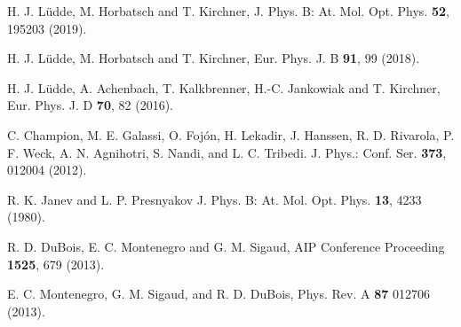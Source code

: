\documentclass[10pt,showpacs,showkeys,twocolumn]{revtex4-1}
\begin{document}
\begin{thebibliography}{}
H. J. L\"udde,  M. Horbatsch and T. Kirchner, 
J. Phys. B: At. Mol. Opt. Phys. \textbf{52}, 195203 (2019).

H. J. L\"udde, M. Horbatsch and T. Kirchner, 
Eur. Phys. J. B \textbf{91}, 99 (2018).

H. J. L\"udde, A. Achenbach, T. Kalkbrenner, H.-C. Jankowiak and T. Kirchner,
Eur. Phys. J. D \textbf{70}, 82 (2016).

C. Champion, M. E. Galassi, O. Foj\'{o}n, H. Lekadir, J. Hanssen, 
R. D. Rivarola, P. F. Weck, A. N. Agnihotri, S. Nandi, and L. C. Tribedi. 
J. Phys.: Conf. Ser. \textbf{373}, 012004 (2012).


R. K. Janev and L. P. Presnyakov 
J. Phys. B: At. Mol. Opt. Phys.  \textbf{13}, 4233 (1980).

R. D. DuBois, E. C. Montenegro and G. M. Sigaud,
AIP Conference Proceeding \textbf{1525}, 679 (2013).

E. C. Montenegro, G. M. Sigaud, and R. D. DuBois, 
Phys. Rev. A \textbf{87} 012706 (2013).


\end{thebibliography}
\end{document}
